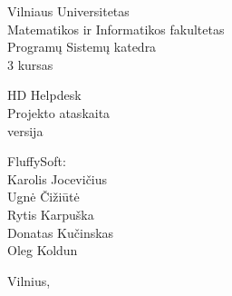 \begin{titlepage}
    \begin{center}

        {\large
            Vilniaus Universitetas \\
            Matematikos ir Informatikos fakultetas \\
            Programų Sistemų katedra \\
            3 kursas
        }

        \vspace{\fill}

        {\huge
            HD Helpdesk
        } \\[0.5cm]
        {\large
            Projekto ataskaita \\
            \versionString{} versija
        }

        \vspace{3cm}

        \begin{flushright}
            \begin{minipage}{0.4\textwidth}
                FluffySoft: \\
                Karolis Jocevičius \\
                Ugnė Čižiūtė \\
                Rytis Karpuška \\
                Donatas Kučinskas \\
                Oleg Koldun
            \end{minipage}
        \end{flushright}

        \vspace{\fill}

        {\large Vilnius, \the\year}

    \end{center}
\end{titlepage}
